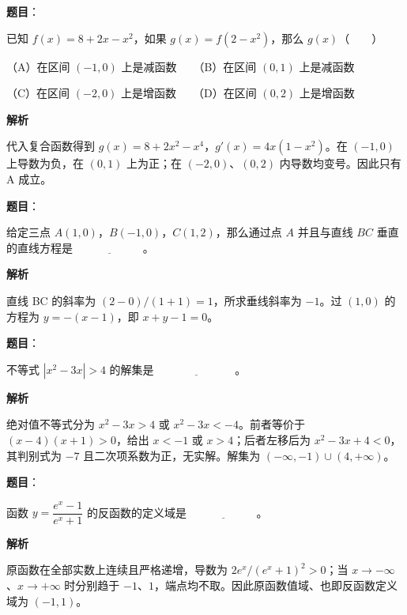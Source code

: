 \begin{answer}

\textbf{题目}：

已知 $f(x)=8+2x-x^2$，如果 $g(x)=f(2-x^2)$，那么 $g(x)$\mbox{（　　）}

（A）在区间 $(-1,0)$ 上是减函数　　（B）在区间 $(0,1)$ 上是减函数

（C）在区间 $(-2,0)$ 上是增函数　　（D）在区间 $(0,2)$ 上是增函数

\textbf{解析}

代入复合函数得到 $g(x)=8+2x^2-x^4$，$g'(x)=4x(1-x^2)$。在 $(-1,0)$ 上导数为负，在 $(0,1)$ 上为正；在 $(-2,0)$、$(0,2)$ 内导数均变号。因此只有 A 成立。


\end{answer}
\begin{answer}

\textbf{题目}：

给定三点 $A(1,0)$，$B(-1,0)$，$C(1,2)$，那么通过点 $A$ 并且与直线 $BC$ 垂直的直线方程是 $\underline{\hspace{6em}}$。

\textbf{解析}

直线 BC 的斜率为 $(2-0)/(1+1)=1$，所求垂线斜率为 $-1$。过 $(1,0)$ 的方程为 $y=-(x-1)$，即 $x+y-1=0$。


\end{answer}
\begin{answer}

\textbf{题目}：

不等式 $|x^2-3x|>4$ 的解集是 $\underline{\hspace{7em}}$。

\textbf{解析}

绝对值不等式分为 $x^2-3x>4$ 或 $x^2-3x<-4$。前者等价于 $(x-4)(x+1)>0$，给出 $x<-1$ 或 $x>4$；后者左移后为 $x^2-3x+4<0$，其判别式为 $-7$ 且二次项系数为正，无实解。解集为 $(-\infty,-1)\cup(4,+\infty)$。


\end{answer}
\begin{answer}

\textbf{题目}：

函数 $y=\dfrac{e^x-1}{e^x+1}$ 的反函数的定义域是 $\underline{\hspace{6em}}$。

\textbf{解析}

原函数在全部实数上连续且严格递增，导数为 $2e^x/(e^x+1)^2>0$；当 $x\to-\infty$、$x\to+\infty$ 时分别趋于 $-1$、$1$，端点均不取。因此原函数值域、也即反函数定义域为 $(-1,1)$。


\end{answer}
